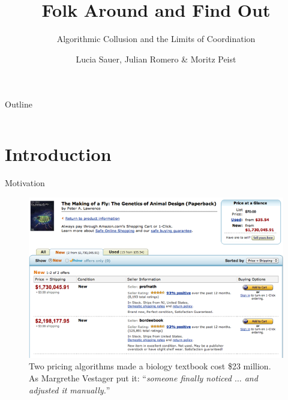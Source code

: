 \documentclass[10pt, aspectratio=169]{beamer}
\title{Folk Around and Find Out}
\subtitle{Algorithmic Collusion and the Limits of Coordination}
\date{}
\author{Lucia Sauer, Julian Romero \& Moritz Peist }
\institute{Barcelona School of Economics}
\begin{document}
\maketitle

\begin{frame}{Outline}
    \begin{columns}[c]
        \begin{column}{0.45\textwidth}
            \tableofcontents
        \end{column}
        \begin{column}{0.45\textwidth}
            
        \end{column}
    \end{columns}
\end{frame}


\section{Introduction}

\begin{frame}{Motivation}
\begin{figure}
        \centering
        \includegraphics[width=0.65\linewidth]{latex/slides_pricing_collusion/imgs/the_making_of_a_fly.png}
        \caption{Two pricing algorithms made a biology textbook cost \$23 million. As Margrethe Vestager \parencite*{vestager_algorithms_2017} put it: \enquote{\emph{someone finally noticed $\ldots$ and adjusted it manually.}}}
        \label{fig:rep_org}
    \end{figure}  
\end{frame}
\end{document}

